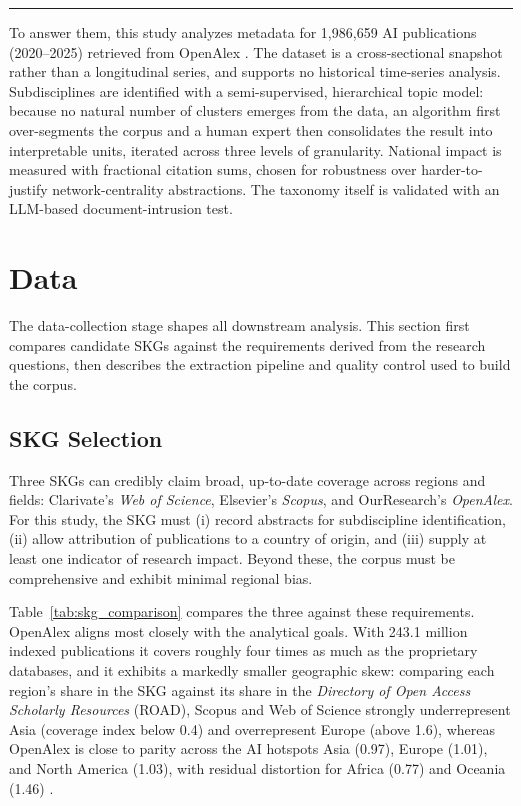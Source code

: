 \documentclass{article}
\let\cite\parencite
\begin{document}
	\vspace{0.25em}
	\rule{\linewidth}{0.4pt}
	\vspace{1em}
	
	To answer them, this study analyzes metadata for 1,986,659 AI publications (2020--2025) retrieved from OpenAlex \cite{openalex2023}. The dataset is a cross-sectional snapshot rather than a longitudinal series, and supports no historical time-series analysis. Subdisciplines are identified with a semi-supervised, hierarchical topic model: because no natural number of clusters emerges from the data, an algorithm first over-segments the corpus and a human expert then consolidates the result into interpretable units, iterated across three levels of granularity. National impact is measured with fractional citation sums, chosen for robustness over harder-to-justify network-centrality abstractions. The taxonomy itself is validated with an LLM-based document-intrusion test.
	
	\section{Data}
	
	The data-collection stage shapes all downstream analysis. This section first compares candidate SKGs against the requirements derived from the research questions, then describes the extraction pipeline and quality control used to build the corpus.
	
	\subsection{SKG Selection}
	\label{skg_selection}
	
	Three SKGs can credibly claim broad, up-to-date coverage across regions and fields: Clarivate's \textit{Web of Science}, Elsevier's \textit{Scopus}, and OurResearch's \textit{OpenAlex}. For this study, the SKG must (i) record abstracts for subdiscipline identification, (ii) allow attribution of publications to a country of origin, and (iii) supply at least one indicator of research impact. Beyond these, the corpus must be comprehensive and exhibit minimal regional bias.
	
	Table~\ref{tab:skg_comparison} compares the three against these requirements. OpenAlex aligns most closely with the analytical goals. With 243.1 million indexed publications it covers roughly four times as much as the proprietary databases, and it exhibits a markedly smaller geographic skew: comparing each region's share in the SKG against its share in the \textit{Directory of Open Access Scholarly Resources} (ROAD), Scopus and Web of Science strongly underrepresent Asia (coverage index below 0.4) and overrepresent Europe (above 1.6), whereas OpenAlex is close to parity across the AI hotspots Asia (0.97), Europe (1.01), and North America (1.03), with residual distortion for Africa (0.77) and Oceania (1.46) \cite{Maddi2025GeographicalDisciplinaryCoverage}.
	
\end{document}
